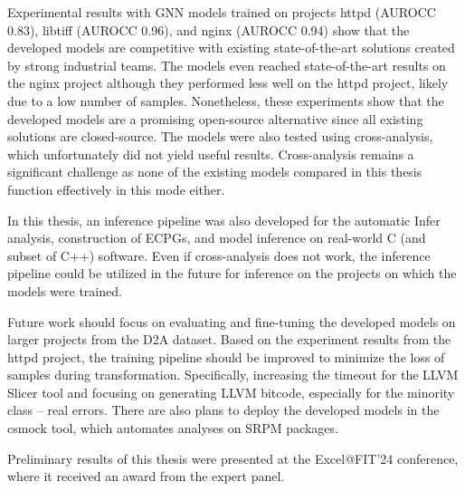 Experimental results with GNN models trained on projects httpd (AUROCC 0.83), libtiff (AUROCC 0.96), and nginx (AUROCC 0.94) show that the developed models are competitive with existing state-of-the-art solutions created by strong industrial teams. The models even reached state-of-the-art results on the nginx project although they performed less well on the httpd project, likely due to a low number of samples. Nonetheless, these experiments show that the developed models are a promising open-source alternative since all existing solutions are closed-source. The models were also tested using cross-analysis, which unfortunately did not yield useful results. Cross-analysis remains a significant challenge as none of the existing models compared in this thesis function effectively in this mode either.

In this thesis, an inference pipeline was also developed for the automatic Infer analysis, construction of ECPGs, and model inference on real-world C (and subset of C++) software. Even if cross-analysis does not work, the inference pipeline could be utilized in the future for inference on the projects on which the models were trained.

Future work should focus on evaluating and fine-tuning the developed models on larger projects from the D2A dataset. Based on the experiment results from the httpd project, the training pipeline should be improved to minimize the loss of samples during transformation. Specifically, increasing the timeout for the LLVM Slicer tool and focusing on generating LLVM bitcode, especially for the minority class -- real errors. There are also plans to deploy the developed models in the csmock tool, which automates analyses on SRPM packages.

Preliminary results of this thesis were presented at the Excel@FIT'24 conference, where it received an award from the expert panel.
\vspace{-1cm}